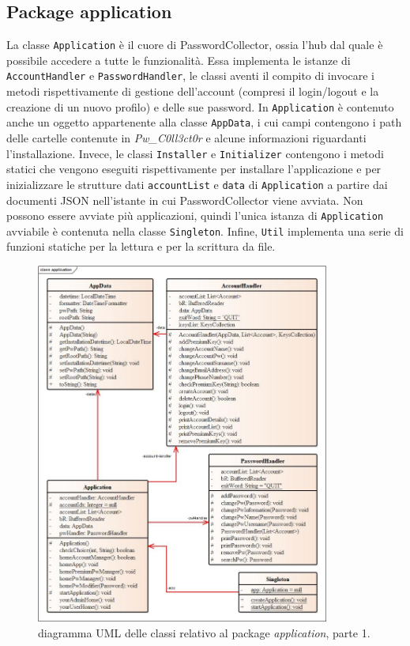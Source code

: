 \documentclass[a4paper, 12pt, one column, aas_macros]{article}
\begin{document}
	\subsection{Package application}
	La classe \verb|Application| è il cuore di PasswordCollector, ossia l'hub dal quale è possibile accedere a tutte le funzionalità. Essa implementa le istanze di \verb|AccountHandler| e \verb|PasswordHandler|, le classi aventi il compito di invocare i metodi rispettivamente di gestione dell'account (compresi il login/logout e la creazione di un nuovo profilo) e delle sue password. In \verb|Application| è contenuto anche un oggetto appartenente alla classe \verb|AppData|, i cui campi contengono i path delle cartelle contenute in \textit{Pw\_C0ll3ct0r} e alcune informazioni riguardanti l'installazione. Invece, le classi \verb|Installer| e \verb|Initializer| contengono i metodi statici che vengono eseguiti rispettivamente per installare l'applicazione e per inizializzare le strutture dati \verb|accountList| e \verb|data| di \verb|Application| a partire dai documenti JSON nell'istante in cui PasswordCollector viene avviata. Non possono essere avviate più applicazioni, quindi l'unica istanza di \verb|Application| avviabile è contenuta nella classe \verb|Singleton|. Infine, \verb|Util| implementa una serie di funzioni statiche per la lettura e per la scrittura da file.
	\begin{figure}[h!]
		\centering
		\includegraphics[height=450px]{UML/application1.jpg}
		\caption{diagramma UML delle classi relativo al package \textit{application}, parte \num{1}.}
		\label{UML_application_1}
	\end{figure}
\end{document}
